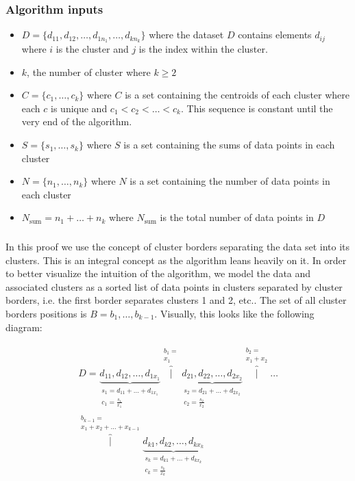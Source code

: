 \documentclass[conference,compsoc]{IEEEtran}
\begin{document}
\subsubsection{Algorithm inputs}
\begin{itemize}
\item $D = \{d_{11}, d_{12}, \dots , d_{1n_1}, \dots, d_{kn_k}\}$ where the dataset $D$ contains elements $d_{ij}$ where $i$ is the cluster and $j$ is the index within the cluster. 
\item $k$, the number of cluster where $k \geq 2$
\item $C = \{c_1, \dots, c_k\}$ where $C$ is a set containing the centroids of each cluster where each $c$ is unique and $c_1 < c_2 < \dots < c_k$. This sequence is constant until the very end of the algorithm.
\item $S = \{s_1, \dots, s_k\}$ where $S$ is a set containing the sums of data points in each cluster
\item $N = \{n_1, \dots, n_k\}$ where $N$ is a set containing the number of data points in each cluster
\item $N_{\text{sum}} = {n_1 + \dots + n_k}$ where $N_{\text{sum}}$ is the total number of data points in $D$
\end{itemize}

\subsubsection{}
In this proof we use the concept of cluster borders separating the data set into its clusters.
This is an integral concept as the algorithm leans heavily on it.
In order to better visualize the intuition of the algorithm, we model the data and associated clusters as a sorted list of data points in clusters separated by cluster borders, i.e. the first border separates clusters 1 and 2, etc.. The set of all cluster borders positions is $B = b_1, \dots, b_{k-1}$. Visually, this looks like the following diagram:

\begin{equation}\label{alg-vis}\begin{aligned}
D=
\underbrace{d_{11}, d_{12}, \dots, d_{1x_1}}_{\substack{s_1 = d_{11} + \dots + d_{1x_1} \\  c_1 = \frac{s_1}{x_1}}}
\overbrace{|}^{\substack{b_1 = \\ x_1}}
\underbrace{d_{21}, d_{22}, \dots, d_{2x_2}}_{\substack{s_2 = d_{21} + \dots + d_{2x_2} \\  c_2 = \frac{s_2}{x_2}}}
\overbrace{|}^{\substack{b_2 = \\ x_1 + x_2}}
\dots \\
\overbrace{|}^{\substack{b_{k-1} = \\ x_1 + x_2 + \dots + x_{k-1}}}
\underbrace{d_{k1}, d_{k2}, \dots, d_{kx_k}}_{\substack{s_k = d_{k1} + \dots + d_{kx_k} \\  c_k = \frac{s_k}{x_k}}}
\end{aligned}
\end{equation}
\end{document}
